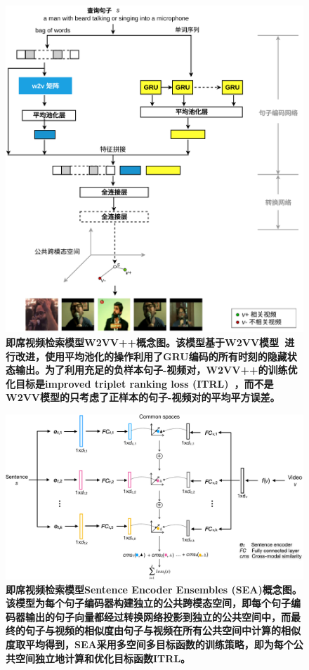 \begin{figure}[tbh!]
    \centering
    \includegraphics[width=\linewidth]{figures/w2vv++v2}
    \caption[即席视频检索模型W2VV++概念图]{\textbf{即席视频检索模型W2VV++概念图。该模型基于W2VV模型~\cite{dong2018predicting}进行改进，使用平均池化的操作利用了GRU编码的所有时刻的隐藏状态输出。为了利用充足的负样本句子-视频对，W2VV++的训练优化目标是improved triplet ranking loss (ITRL)~\cite{faghri2017vse++}，而不是W2VV模型的只考虑了正样本的句子-视频对的平均平方误差。}}
    \label{fig:w2vv++}
\end{figure}

\begin{figure}[tbh!]
    \centering
    \includegraphics[width=\linewidth]{figures/sea}
    \caption[即席视频检索模型SEA概念图]{\textbf{即席视频检索模型Sentence Encoder Ensembles (SEA)概念图。该模型为每个句子编码器构建独立的公共跨模态空间，即每个句子编码器输出的句子向量都经过转换网络投影到独立的公共空间中，而最终的句子与视频的相似度由句子与视频在所有公共空间中计算的相似度取平均得到，SEA采用多空间多目标函数的训练策略，即为每个公共空间独立地计算和优化目标函数ITRL。}}
    \label{fig:sea}
\end{figure}


